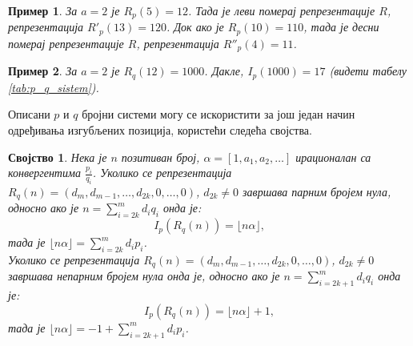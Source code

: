 \documentclass[a4paper]{article}
\newtheorem{example}{Пример}
\newtheorem{property}{Својство}
\begin{document}
\begin{example}
	За $ a = 2 $ је $ R_{p}(5) = 12 $. Тада је леви померај репрезентације $ R $, репрезентација $ R'_{p}(13) = 120 $. Док ако је $ R_{p}(10) = 110 $, тада је десни померај репрезентације $ R $, репрезентација $ R''_{p}(4) = 11 $.
\end{example}

\begin{example}
	За $ a = 2 $ је $ R_{q}(12) = 1000 $. Дакле, $ I_{p}(1000) = 17 $ (видети табелу \ref{tab:p_q_sistem}).
\end{example}

Описани $ p $ и $ q $ бројни системи могу се искористити за још један начин одређивања изгубљених позиција, користећи следећа својства.

\begin{property}
	\label{prop:r_q_nule}
	Нека је $ n $ позитиван број, $ \alpha = [1, a_{1}, a_{2}, \ldots] $ ирационалан са конвергентима $ {\frac{p_{i}}{q_{i}}} $. Уколико се репрезентација $ R_q(n) = (d_{m}, d_{m-1}, \ldots , d_{2k}, 0, \ldots, 0) $, $ d_{2k} \neq 0 $ завршава парним бројем нула, односно ако је $ n = \sum_{i = 2k}^{m} d_{i}q_{i} $ онда је:	
		\begin{displaymath}
			I_{p}(R_q(n)) = \lfloor n \alpha \rfloor,
		\end{displaymath}	
	тада је $ \lfloor n \alpha \rfloor = \sum_{i = 2k}^{m} d_{i}p_{i} $.\\	
	Уколико се репрезентација $ R_q(n) = (d_{m}, d_{m-1}, \ldots , d_{2k}, 0, \ldots, 0) $, $ d_{2k} \neq 0 $ завршава непарним бројем нула онда је, односно ако је $ n = \sum_{i = 2k+1}^{m} d_{i}q_{i} $ онда је:
		\begin{displaymath}
			I_{p}(R_q(n)) = \lfloor n \alpha \rfloor + 1,
		\end{displaymath}
	тада је $ \lfloor n \alpha \rfloor = -1 + \sum_{i = 2k+1}^{m} d_{i}p_{i} $.	
\end{property}
\end{document}
